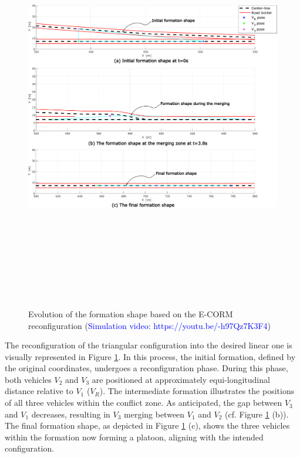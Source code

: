  
        \begin{figure}[!h]
        \centering 
        \includegraphics[width=12cm,height=18cm,keepaspectratio]{chapters/Chapitre_5/Figures/E-CORM/Formation_shape.pdf}
        \caption{Evolution of the formation shape based on the E-CORM reconfiguration (\textcolor{blue}{Simulation video: https://youtu.be/-h97Qz7K3F4})}
        \label{fig:E-CORM: formation_shape}
        \end{figure}


The reconfiguration of the triangular configuration into the desired linear one is visually represented in Figure \ref{fig:E-CORM: formation_shape}. In this process, the initial formation, defined by the original coordinates, undergoes a reconfiguration phase. During this phase, both vehicles $V_2$ and $V_3$ are positioned at approximately equi-longitudinal distance relative to $V_1$ ($V_R$). The intermediate formation illustrates the positions of all three vehicles within the conflict zone. As anticipated, the gap between $V_3$ and $V_1$ decreases, resulting in $V_3$ merging between $V_1$ and $V_2$ (cf. Figure \ref{fig:E-CORM: formation_shape} (b)). The final formation shape, as depicted in Figure \ref{fig:E-CORM: formation_shape} (c), shows the three vehicles within the formation now forming a platoon, aligning with the intended configuration. 



